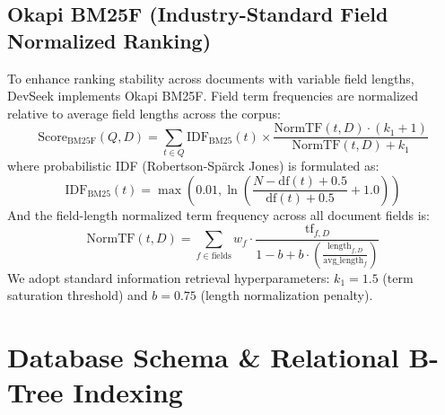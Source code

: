 \documentclass[12pt,a4paper]{article}
\begin{document}
\subsection{Okapi BM25F (Industry-Standard Field Normalized Ranking)}
To enhance ranking stability across documents with variable field lengths, DevSeek implements Okapi BM25F. Field term frequencies are normalized relative to average field lengths across the corpus:
\begin{equation}
\text{Score}_{\text{BM25F}}(Q, D) = \sum_{t \in Q} \text{IDF}_{\text{BM25}}(t) \times \frac{\text{NormTF}(t, D) \cdot (k_1 + 1)}{\text{NormTF}(t, D) + k_1}
\end{equation}
where probabilistic IDF (Robertson-Spärck Jones) is formulated as:
\begin{equation}
\text{IDF}_{\text{BM25}}(t) = \max \left( 0.01, \ln \left( \frac{N - \text{df}(t) + 0.5}{\text{df}(t) + 0.5} + 1.0 \right) \right)
\end{equation}
And the field-length normalized term frequency across all document fields is:
\begin{equation}
\text{NormTF}(t, D) = \sum_{f \in \text{fields}} w_f \cdot \frac{\text{tf}_{f, D}}{1 - b + b \cdot \left( \frac{\text{length}_{f, D}}{\text{avg\_length}_f} \right)}
\end{equation}
We adopt standard information retrieval hyperparameters: $k_1 = 1.5$ (term saturation threshold) and $b = 0.75$ (length normalization penalty).

\section{Database Schema \& Relational B-Tree Indexing}
\end{document}

